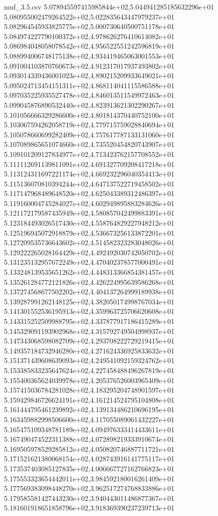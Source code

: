 \begin{filecontents*}{muf_3.5.csv}
5.078945597415985844e+02,5.044941285185632296e+01
5.080955002479264522e+02,5.022835643447979237e+01
5.082964545933825775e+02,5.000730640500751178e+01
5.084974227790100372e+02,4.978626276410614082e+01
5.086984048058078542e+02,4.956522551242596819e+01
5.088994006748175138e+02,4.934419465063001553e+01
5.091004103870760673e+02,4.912317017937493802e+01
5.093014339436001023e+02,4.890215209933649021e+01
5.095024713454151311e+02,4.868114041115586588e+01
5.097035225935527478e+02,4.846013511549972463e+01
5.099045876890532440e+02,4.823913621302290267e+01
5.101056666329286600e+02,4.801814370440752100e+01
5.103067594262058719e+02,4.779715759028840694e+01
5.105078660699282409e+02,4.757617787133131060e+01
5.107089865651074660e+02,4.735520454820743907e+01
5.109101209127834977e+02,4.713423762157708552e+01
5.111112691139811091e+02,4.691327709208417218e+01
5.113124311697221174e+02,4.669232296040354413e+01
5.115136070810394244e+02,4.647137522719458502e+01
5.117147968489648520e+02,4.625043389312486397e+01
5.119160004745284027e+02,4.602949895883284626e+01
5.121172179587435949e+02,4.580857042499883391e+01
5.123184493026517430e+02,4.558764829227948212e+01
5.125196945072918879e+02,4.536673256133872201e+01
5.127209535736643602e+02,4.514582323283048026e+01
5.129222265028164429e+02,4.492492030742050702e+01
5.131235132957672249e+02,4.470402378577000491e+01
5.133248139535651262e+02,4.448313366854381457e+01
5.135261284772121826e+02,4.426224995639586268e+01
5.137274568677502202e+02,4.404137264999189938e+01
5.139287991262148125e+02,4.382050174998767034e+01
5.141301552536195913e+02,4.359963725706620608e+01
5.143315252509988795e+02,4.337877917186415289e+01
5.145329091193902968e+02,4.315792749504998937e+01
5.147343068598082709e+02,4.293708222729219415e+01
5.149357184732946280e+02,4.271624336925833632e+01
5.151371439608639093e+02,4.249541092159324762e+01
5.153385833235647624e+02,4.227458488496267819e+01
5.155400365624039978e+02,4.205376526003965409e+01
5.157415036784281028e+02,4.183295204748901597e+01
5.159429846726624191e+02,4.161214524795104808e+01
5.161444795461239892e+02,4.139134486210696195e+01
5.163459882998506600e+02,4.117055089061432227e+01
5.165475109348781189e+02,4.094976333414433611e+01
5.167490474522311388e+02,4.072898219333910674e+01
5.169505978529285812e+02,4.050820746887711721e+01
5.171521621380068154e+02,4.028743916141775117e+01
5.173537403085127835e+02,4.006667727162766823e+01
5.175553323654442011e+02,3.984592180016261409e+01
5.177569383098448270e+02,3.962517274768833886e+01
5.179585581427443230e+02,3.940443011486877367e+01
5.181601918651858796e+02,3.918369390237239713e+01

\end{filecontents*}
